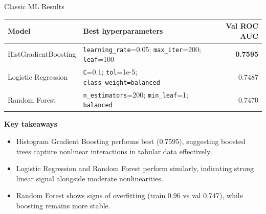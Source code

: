 \documentclass[aspectratio=169,11pt]{beamer}
\newcommand{\hi}[1]{{\color{accent}\textbf{#1}}}
\newcommand{\hp}[1]{{\color{primary}\textbf{#1}}}
\begin{document}
\begin{frame}{Classic ML Results}

\footnotesize
\begin{tabularx}{\textwidth}{@{}l L r@{}}
    \toprule
    \hp{Model} & \hp{Best hyperparameters} & \hp{Val ROC AUC} \\
    \midrule
    HistGradientBoosting
        & \texttt{learning\_rate}=0.05; \texttt{max\_iter}=200; \texttt{leaf}=100
        & \hi{\textbf{0.7595}} \\[0.2em]
    Logistic Regression
        & \texttt{C}=0.1; \texttt{tol}=1e-5; \texttt{class\_weight=balanced}
        & 0.7487 \\[0.2em]
    Random Forest
        & \texttt{n\_estimators}=200; \texttt{min\_leaf}=1; \texttt{balanced}
        & 0.7470 \\
    \bottomrule
\end{tabularx}

\vspace{0.35cm}

\textbf{Key takeaways}
\begin{itemize}
    \item Histogram Gradient Boosting performs best (0.7595), suggesting boosted trees capture nonlinear interactions in tabular data effectively.

    \item Logistic Regression and Random Forest perform similarly, indicating strong linear signal alongside moderate nonlinearities.

    \item Random Forest shows signs of overfitting (train 0.96 vs val 0.747), while boosting remains more stable.
\end{itemize}

\end{frame}


\end{document}
